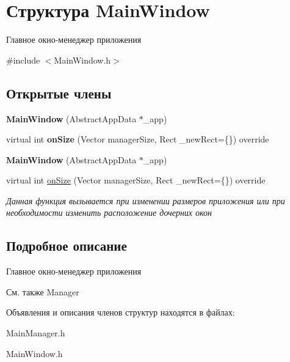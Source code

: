 \hypertarget{struct_main_window}{
\section{Структура MainWindow}
\label{struct_main_window}
}


Главное окно-\/менеджер приложения  




{\ttfamily \#include $<$MainWindow.h$>$}

\subsection*{Открытые члены}
\begin{DoxyCompactItemize}
\item 
\hypertarget{struct_main_window_aeaa6e32cedf84f6b1bebcaa649363631}{
{\bfseries MainWindow} (AbstractAppData $\ast$\_\-app)}
\label{struct_main_window_aeaa6e32cedf84f6b1bebcaa649363631}

\item 
\hypertarget{struct_main_window_ae135fdc461d4d39e884509fae4064aa5}{
virtual int {\bfseries onSize} (Vector managerSize, Rect \_\-newRect=\{\}) override}
\label{struct_main_window_ae135fdc461d4d39e884509fae4064aa5}

\item 
\hypertarget{struct_main_window_aeaa6e32cedf84f6b1bebcaa649363631}{
{\bfseries MainWindow} (AbstractAppData $\ast$\_\-app)}
\label{struct_main_window_aeaa6e32cedf84f6b1bebcaa649363631}

\item 
virtual int \hyperlink{group___u_i_gae135fdc461d4d39e884509fae4064aa5}{onSize} (Vector managerSize, Rect \_\-newRect=\{\}) override
\begin{DoxyCompactList}\small\item\em Данная функция вызывается при изменении размеров приложения или при необходимости изменить расположение дочерних окон \item\end{DoxyCompactList}\end{DoxyCompactItemize}


\subsection{Подробное описание}
Главное окно-\/менеджер приложения \begin{DoxySeeAlso}{См. также}
Manager  
\end{DoxySeeAlso}


Объявления и описания членов структур находятся в файлах:\begin{DoxyCompactItemize}
\item 
MainManager.h\item 
MainWindow.h\end{DoxyCompactItemize}
